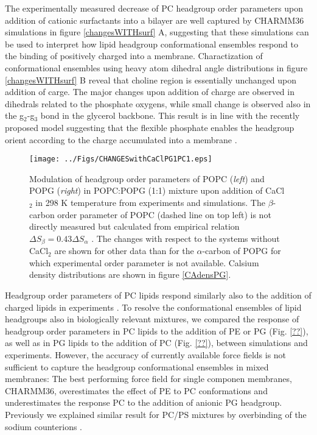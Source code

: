 \documentclass[aps,prl,superscriptaddress,twocolumn]{revtex4}
\begin{document}
The experimentally measured decrease of PC headgroup order parameters upon addition of cationic surfactants into a bilayer
are well captured by CHARMM36 simulations in figure \ref{changesWITHsurf} A,
suggesting that these simulations can be used to interpret how lipid headgroup conformational ensembles
respond to the binding of positively charged into a membrane.
Charactization of conformational ensembles using heavy atom dihedral angle distributions in figure \ref{changesWITHsurf} B
reveal that choline region is essentially unchanged upon addition of carge.
The major changes upon addition of charge are observed in dihedrals related to the phosphate oxygens,
while small change is observed also in the g$_2$-g$_3$ bond in the glycerol backbone.
This result is in line with the recently proposed model suggesting that the flexible phosphate enables the headgroup
orient according to the charge accumulated into a membrane \cite{antila21}.

\begin{figure*}[]
  \centering
  \texttt{[image: ../Figs/CHANGESwithCaClPG1PC1.eps]}
  \caption{\label{changesWITHCaClPG}
    Modulation of headgroup order parameters of POPC ({\it left}) and POPG ({\it right}) in POPC:POPG (1:1)
    mixture upon addition of CaCl$_2$ in 298 K temperature from experiments \cite{borle85,macdonald87} and simulations.
    The $\beta$-carbon order parameter of POPC (dashed line on top left) is not directly measured but
    calculated from empirical relation $\Delta S_{\beta}=0.43\Delta S_{\alpha}$ \cite{akutsu81}.
    The changes with respect to the systems without CaCl$_2$ are shown for other data than
    for the $\alpha$-carbon of POPG for which experimental order parameter is not available.
    Calsium density distributions are shown in figure \ref{CAdensPG}.
  }
\end{figure*}


Headgroup order parameters of PC lipids respond similarly also to the addition of charged lipids in experiments \cite{??}.
To resolve the conformational ensembles of lipid headgroups also in biologically relevant
mixtures, %
we compared the response of headgroup order parameters in
PC lipids to the addition of PE or PG (Fig. \ref{??}),
as well as in PG lipids to the addition of PC (Fig. \ref{??}),
between simulations and experiments. However, the accuracy of currently available force fields
is not sufficient to capture the headgroup conformational ensembles
in mixed membranes: 
The best performing force field for single componen membranes, CHARMM36, overestimates
the effect of PE to PC conformations and underestimates the response PC to the addition
of anionic PG headgroup. Previously we explained similar result for PC/PS mixtures  
by overbinding of the sodium counterions \cite{antila19}.
\end{document}
